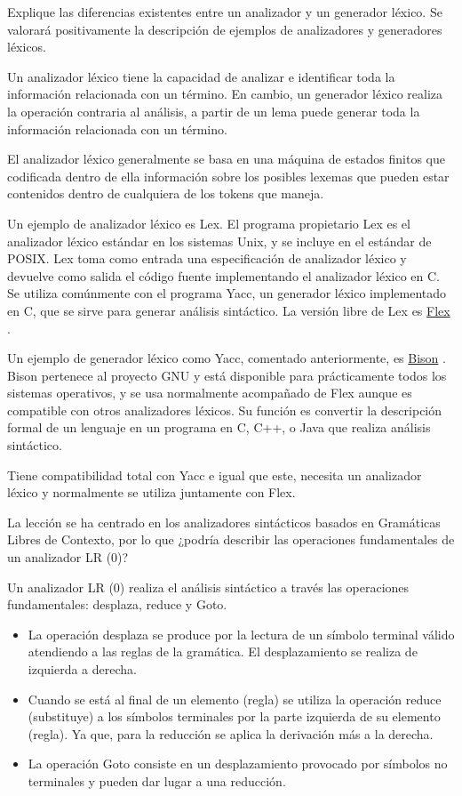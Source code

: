 \documentclass[11pt]{exam}
\begin{document}
\begin{questions}
\question Explique las diferencias existentes entre un analizador y un generador léxico. Se valorará positivamente la descripción de ejemplos de analizadores y generadores léxicos. 

Un analizador léxico tiene la capacidad de analizar e identificar toda la información relacionada con un término. En cambio, un generador léxico realiza la operación contraria al análisis, a partir de un lema puede generar toda la información relacionada con un término.

El analizador léxico generalmente se basa en una máquina de estados finitos que codificada dentro de ella información sobre los posibles lexemas que pueden estar contenidos dentro de cualquiera de los tokens que maneja.

Un ejemplo de analizador léxico es Lex. El programa propietario Lex es el analizador léxico estándar en los sistemas Unix, y se incluye en el estándar de POSIX. Lex toma como entrada una especificación de analizador léxico y devuelve como salida el código fuente implementando el analizador léxico en C. Se utiliza comúnmente con el programa Yacc, un generador léxico implementado en C, que se sirve para generar análisis sintáctico. La versión libre de Lex es \href{https://github.com/westes/flex/}{Flex} .

Un ejemplo de generador léxico como Yacc, comentado anteriormente, es \href{https://www.gnu.org/software/bison/}{Bison} . Bison pertenece al proyecto GNU y está disponible para prácticamente todos los sistemas operativos, y se usa normalmente acompañado de Flex aunque es compatible con otros analizadores léxicos. Su función es convertir la descripción formal de un lenguaje en un programa en C, C++, o Java que realiza análisis sintáctico. 

Tiene compatibilidad total con Yacc e igual que este, necesita un analizador léxico y normalmente se utiliza juntamente con Flex.

\question La lección se ha centrado en los analizadores sintácticos basados en Gramáticas Libres de Contexto, por lo que ¿podría describir las operaciones fundamentales de un analizador LR (0)?

Un analizador LR (0) realiza el análisis sintáctico a través las operaciones fundamentales: desplaza, reduce y Goto. 

\begin{itemize}
	\item La operación desplaza se produce por la lectura de un símbolo terminal válido atendiendo a las reglas de la gramática. El desplazamiento se realiza de izquierda a derecha.
	\item Cuando se está al final de un elemento (regla) se utiliza la operación reduce (substituye) a los símbolos terminales por la parte izquierda de su elemento (regla). Ya que, para la reducción se aplica la derivación más a la derecha.
	\item La operación Goto consiste en un desplazamiento provocado por símbolos no terminales y pueden dar lugar a una	reducción.
\end{itemize}


\end{questions}
\end{document}
